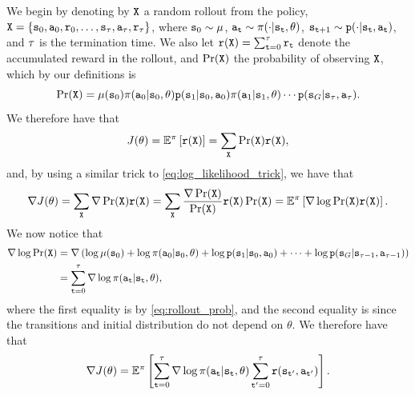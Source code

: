 We begin by denoting by $\texttt{X}$ a random rollout from the policy, $\texttt{X} = \{{\tt s}_0,{\tt a}_0,{\tt r}_0,\dots,{\tt s}_\tau, {\tt a}_\tau, {\tt r}_\tau \}$, where ${\tt s}_0 \sim \mu$, ${\tt a}_{\tt t}\sim \pi(\cdot|{\tt s}_{\tt t},\theta)$, ${\tt s}_{{\tt t}+1} \sim {\tt p} (\cdot | {\tt s}_{\tt t}, {\tt a}_{\tt t})$, and $\tau$ is the termination time. We also let ${\tt r}(\texttt{X}) = \sum_{{\tt t}=0}^\tau {\tt r}_{\tt t}$ denote the accumulated reward in the rollout, and $\Pr(\texttt{X})$ the probability of observing $\texttt{X}$, which by our definitions is 
\begin{equation}\label{eq:rollout_prob}
\Pr(\texttt{X}) = \mu({\tt s}_0)\pi({\tt a}_0|{\tt s}_0,\theta){\tt p}({\tt s}_1|{\tt s}_0,{\tt a}_0)\pi({\tt a}_1|{\tt s}_1,\theta)\cdots{\tt p}({\tt s}_G|{\tt s}_{\tau},{\tt a}_{\tau}).
\end{equation}
We therefore have that
\begin{equation*}
    J(\theta) = \mathbb{E}^{\pi}\left[ {\tt r}(\texttt{X}) \right] = \sum_{\texttt{X}} \Pr(\texttt{X}) {\tt r}(\texttt{X}),
\end{equation*}
and, by using a similar trick to \eqref{eq:log_likelihood_trick}, we have that 
\begin{equation*}
    \nabla J(\theta) = \sum_{\texttt{X}} \nabla \Pr(\texttt{X}) {\tt r}(\texttt{X}) = \sum_{\texttt{X}} \frac{\nabla \Pr(\texttt{X})}{\Pr(\texttt{X})} {\tt r}(\texttt{X}) \Pr(\texttt{X}) = \mathbb{E}^{\pi}\left[ \nabla \log \Pr(\texttt{X}){\tt r}(\texttt{X}) \right].
\end{equation*}
We now notice that 
\begin{equation*}
\begin{split}
    \nabla \log \Pr(\texttt{X}) &= \nabla \left( \log \mu({\tt s}_0) + \log \pi({\tt a}_0|{\tt s}_0,\theta) + \log{\tt p}({\tt s}_1|{\tt s}_0,{\tt a}_0) + \dots + \log{\tt p}({\tt s}_G|{\tt s}_{\tau-1},{\tt a}_{\tau-1})\right) \\
    &= \sum_{{\tt t}=0}^{\tau} \nabla\log \pi({\tt a}_{\tt t}|{\tt s}_{\tt t},\theta),
\end{split}
\end{equation*}
where the first equality is by \eqref{eq:rollout_prob}, and the second equality is since the transitions and initial distribution do not depend on $\theta$. We therefore have that
\begin{equation}\label{eq:pg_score_1}
    \nabla J(\theta) = \mathbb{E}^{\pi}\left[ \sum_{{\tt t}=0}^\tau \nabla\log \pi({\tt a}_{\tt t}|{\tt s}_{\tt t},\theta) \sum_{{\tt t}'=0}^\tau {\tt r}({\tt s}_{{\tt t}'},{\tt a}_{{\tt t}'})\right].
\end{equation}
